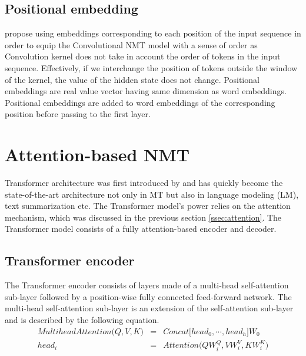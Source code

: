 \subsection{Positional embedding}
\citet{Ghering17convolutional} propose using embeddings corresponding to each position of the input sequence in order to equip the Convolutional NMT model with a sense of order as Convolution kernel does not take in account the order of tokens in the input sequence. Effectively, if we interchange the position of tokens outside the window of the kernel, the value of the hidden state does not change. Positional embeddings are real value vector having same dimension as word embeddings. Positional embeddings are added to word embeddings of the corresponding position before passing to the first layer.

\section{Attention-based NMT} \label{sec:transformer}
Transformer architecture was first introduced by \cite{Vaswani17attention} and has quickly become the state-of-the-art architecture not only in MT but also in language modeling (LM)\cite{Devlin19bert,Brown20language,Conneau19cross}, text summarization \cite{Zhang20pegasus} etc. The Transformer model's power relies on the attention mechanism, which was discussed in the previous section \ref{ssec:attention}. The Transformer model consists of a fully attention-based encoder and decoder. 
\subsection{Transformer encoder}
The Transformer encoder consists of layers made of a multi-head self-attention sub-layer followed by a position-wise fully connected feed-forward network. The multi-head self-attention sub-layer is an extension of the self-attention sub-layer and is described by the following equation.
\begin{equation}
\begin{array}{rcl}
MultiheadAttention\big( Q,V,K \big) &=& Concat \big[ head_0, \cdots , head_h \big] W_0\\
head_i &=& Attention \big( QW_i^Q, VW_i^V, KW_i^K \big)\\
\end{array}
\end{equation}

